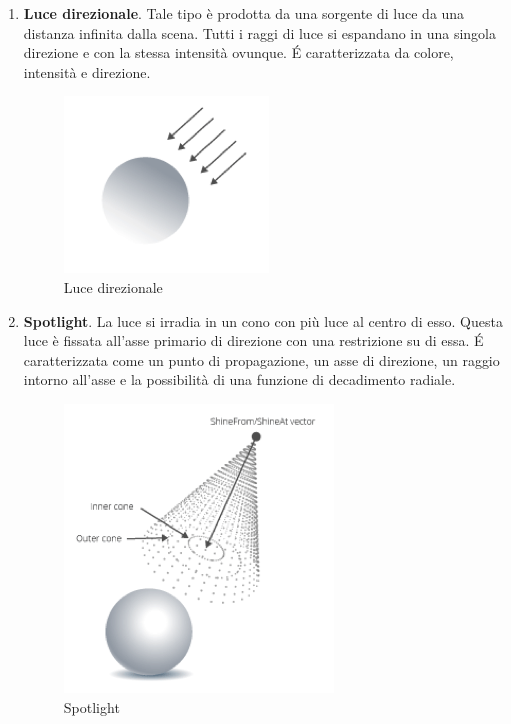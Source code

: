 \documentclass[9pt,a4paper,twoside]{tau}
\begin{document}
\begin{enumerate}
    	\item \textbf{Luce direzionale}. Tale tipo è prodotta da una sorgente di luce da una distanza infinita dalla scena. Tutti i raggi di luce si espandano in una singola direzione e con la stessa intensità ovunque. \'E caratterizzata da colore, intensità e direzione.
    		\begin{figure}[H]
        		\centering
        		\includegraphics[width=0.6\columnwidth]{Figures/03.png}
        		\caption{Luce direzionale}
        		\label{fig:figure}
			\end{figure}
    	\item \textbf{Spotlight}. La luce si irradia in un cono con più luce al centro di esso. Questa luce è fissata all'asse primario di direzione con una restrizione su di essa. \'E caratterizzata come un punto di propagazione, un asse di direzione, un raggio intorno all'asse e la possibilità di una funzione di decadimento radiale. 
    		\begin{figure}[H]
		        \centering
		        \includegraphics[width=0.6\columnwidth]{Figures/04.png}
		        \caption{Spotlight}
		        \label{fig:figure}
			\end{figure}
\end{enumerate}
\end{document}

